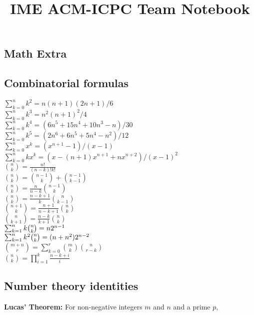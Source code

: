 \documentclass[a4paper,10pt]{article}
\title{\vspace{-4ex}\Large{IME ACM-ICPC Team Notebook}}
\author{}
\date{}
\begin{document}
\begin{landscape}
\begin{multicols}{2}

\maketitle
\vspace{-13ex}
\tableofcontents
\pagestyle{fancy}



\section{Math Extra}
\subsection{Combinatorial formulas}

 $\sum_{k=0}^{n}k^{2}=n(n+1)(2n+1)/6$\\
 $\sum_{k=0}^{n}k^{3}=n^{2}(n+1)^{2}/4$\\
 $\sum_{k=0}^{n}k^{4}=(6n^{5}+15n^{4}+10n^{3}-n)/30$\\
 $\sum_{k=0}^{n}k^{5}=(2n^{6}+6n^{5}+5n^{4}-n^{2})/12$\\
 $\sum_{k=0}^{n}x^{k}=(x^{n+1}-1)/(x-1)$\\
 $\sum_{k=0}^{n}kx^{k}=(x-(n+1)x^{n+1}+nx^{n+2})/(x-1)^{2}$\\
 ${n \choose k}=\frac{n!}{(n-k)!k!}$\\
 ${n \choose k}={n-1 \choose k}+{n-1 \choose k-1}$\\
 ${n \choose k}=\frac{n}{n-k}{n-1 \choose k}$\\
 ${n \choose k}=\frac{n-k+1}{k}{n \choose k-1}$\\
 ${n+1 \choose k}=\frac{n+1}{n-k+1}{n \choose k}$\\
 ${n \choose k+1}=\frac{n-k}{k+1}{n \choose k}$\\
 $\sum_{k=1}^{n}k\tbinom{n}{k}=n2^{n-1}$\\
 $\sum_{k=1}^{n}k^{2}\tbinom{n}{k}=(n+n^{2})2^{n-2}$\\
 ${m+n \choose r}=\sum_{k=0}^{r}{m \choose k}{n \choose r-k}$\\
 ${n \choose k}=\prod_{i=1}^{k}\frac{n-k+i}{i}$\\

\subsection{Number theory identities}
\textbf{Lucas' Theorem:} For non-negative integers $m$ and $n$ and a prime $p$,


\end{multicols}
\end{landscape}
\end{document}
